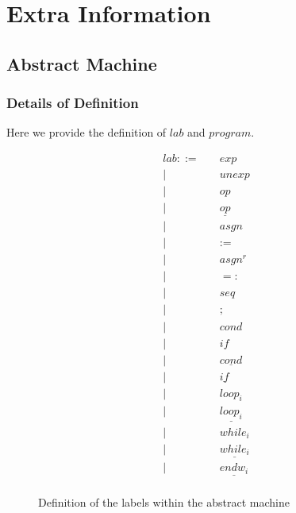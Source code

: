 \chapter{Extra Information}

\section{Abstract Machine}

\subsection{Details of Definition}\label{appendix:amdetails}

Here we provide the definition of $lab$ and $program$.

\begin{figure}[hbt!]
    \centering
    \begin{align*}
        lab ::=&\quad exp \\
        |&\quad unexp \\
        |&\quad op \\
        |&\quad \underline{op} \\
        |&\quad asgn \\
        |&\quad := \\
        |&\quad asgn^r \\
        |&\quad =: \\
        |&\quad seq \\
        |&\quad ; \\
        |&\quad cond \\
        |&\quad if \\
        |&\quad \underline{cond} \\
        |&\quad \underline{if} \\
        |&\quad loop_i \\
        |&\quad \underline{loop_i} \\
        |&\quad while_i \\
        |&\quad \underline{while_i} \\
        |&\quad \underline{endw_i} \\
        \end{align*}
    \caption{Definition of the labels within the abstract machine}
    \label{fig:lab}
\end{figure}

